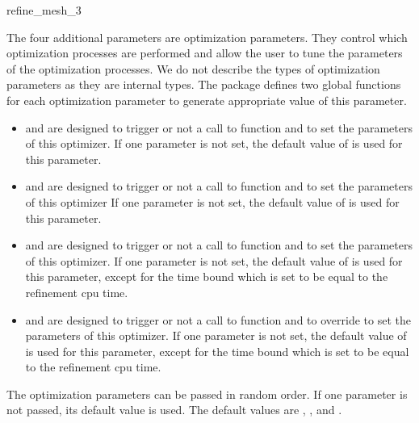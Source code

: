 \begin{ccRefFunction}{refine_mesh_3}
 
The four additional parameters are optimization parameters.
They control which optimization processes are performed
and allow the user to tune the parameters of the optimization processes.
We do not describe  the types of optimization parameters  as they are
internal types. The package defines two global
functions for each optimization parameter
 to generate appropriate value of this parameter.

\begin{itemize}
\item {} and  are designed to
  trigger or not a call to  function and to set the
  parameters of this optimizer. If one parameter is not set, the default value of
   is used for this parameter.
\item {} and  are designed to
  trigger or not a call to  function and 
to set the  parameters of this optimizer
 If one parameter is not set, the default value of
   is used for this parameter.
\item {} and  are designed  to
  trigger or not a call to  function and 
to set the  parameters of this optimizer. If one parameter is not set, the default value of
   is used for this parameter, except for the time bound which is set to be
  equal to the refinement cpu time.
\item {} and  are designed to
  trigger or not a call to  function and  to override to set the
  parameters of this optimizer. If one parameter is not set, the default value of
   is used for this parameter, except for the time bound which is set to be
  equal to the refinement cpu time.
\end{itemize}


The optimization parameters can be passed in random order. If one parameter
is not passed, its default value is used. The default values are
, ,  and .




\ccSeeAlso


\end{ccRefFunction}
